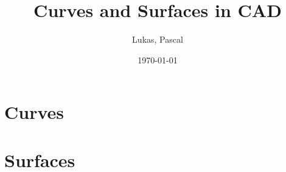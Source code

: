 \documentclass{scrreprt}
\date{\today}
\title{Curves and Surfaces in CAD}
\author{Lukas, Pascal}		%
\begin{document}
\maketitle
\tableofcontents

\part{Curves}




\part{Surfaces}
\end{document}
